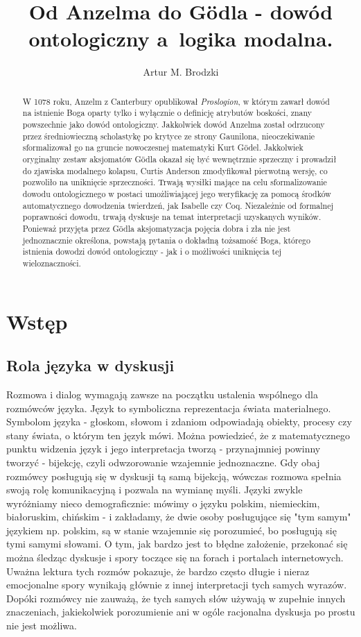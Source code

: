 \documentclass{article}
\title{Od Anzelma do Gödla - dowód ontologiczny a logika modalna.}
\author{Artur M. Brodzki}
\begin{document}
\maketitle

\begin{abstract}
	W 1078 roku, Anzelm z Canterbury opublikował \emph{Proslogion}, w którym zawarł dowód na istnienie Boga oparty tylko i wyłącznie o definicję atrybutów boskości, znany powszechnie jako dowód ontologiczny. Jakkolwiek dowód Anzelma został odrzucony przez średniowieczną scholastykę po krytyce ze strony Gaunilona, nieoczekiwanie sformalizował go na gruncie nowoczesnej matematyki  Kurt Gödel. Jakkolwiek oryginalny zestaw aksjomatów Gödla okazał się być wewnętrznie sprzeczny i prowadził do zjawiska modalnego kolapsu, Curtis Anderson zmodyfikował pierwotną wersję, co pozwoliło na uniknięcie sprzeczności. Trwają wysiłki mające na celu sformalizowanie dowodu ontologicznego w postaci umożliwiającej jego weryfikację za pomocą środków automatycznego dowodzenia twierdzeń, jak Isabelle czy Coq. Niezależnie od formalnej poprawności dowodu, trwają dyskusje na temat interpretacji uzyskanych wyników. Ponieważ przyjęta przez Gödla aksjomatyzacja pojęcia dobra i zła nie jest jednoznacznie określona, powstają pytania o dokładną tożsamość Boga, którego istnienia dowodzi dowód ontologiczny - jak i o możliwości uniknięcia tej wieloznaczności. 
\end{abstract}

\section{Wstęp} \label{sec:intro}

\subsection{Rola języka w dyskusji} \label{sec:language}

Rozmowa i dialog wymagają zawsze na początku ustalenia wspólnego dla rozmówców języka. Język to symboliczna reprezentacja świata materialnego. Symbolom języka - głoskom, słowom i zdaniom odpowiadają obiekty, procesy czy stany świata, o którym ten język mówi. Można powiedzieć, że z matematycznego punktu widzenia język i jego interpretacja tworzą - przynajmniej powinny tworzyć - bijekcję, czyli odwzorowanie wzajemnie jednoznaczne. Gdy obaj rozmówcy posługują się w dyskusji tą samą bijekcją, wówczas rozmowa spełnia swoją rolę komunikacyjną i pozwala na wymianę myśli. Języki zwykle wyróżniamy nieco demograficznie: mówimy o języku polskim, niemieckim, białoruskim, chińskim - i zakładamy, że dwie osoby posługujące się "tym samym" językiem np. polskim, są w stanie wzajemnie się porozumieć, bo posługują się tymi samymi słowami. O tym, jak bardzo jest to błędne założenie, przekonać się można śledząc dyskusje i spory toczące się na forach i portalach internetowych. Uważna lektura tych rozmów pokazuje, że bardzo często długie i nieraz emocjonalne spory wynikają głównie z innej interpretacji tych samych wyrazów. Dopóki rozmówcy nie zauważą, że tych samych słów używają w zupełnie innych znaczeniach, jakiekolwiek porozumienie ani w ogóle racjonalna dyskusja po prostu nie jest możliwa. 
\end{document}
